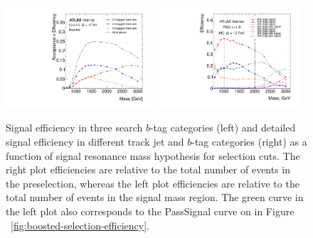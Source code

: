 \begin{figure}
\begin{center}
\includegraphics[width=0.48\textwidth,angle=-90]{figures/boosted/SigEff/region_lst_Moriond_bkg_9_Efficiency_PreSel.pdf}
\includegraphics[width=0.48\textwidth,angle=-90]{figures/boosted/SigEff/detail_lst_Moriond_Efficiency_AllTag_Signal.pdf}
  \caption{Signal efficiency in three search $b$-tag categories (left) and detailed signal efficiency in different track jet and $b$-tag categories (right) as a function of signal resonance mass hypothesis for selection cuts. The right plot efficiencies are relative to the total number of events in the preselection, whereas the left plot efficiencies are relative to the total number of events in the signal mass region. The green curve in the left plot also corresponds to the PassSignal curve on in Figure ~\ref{fig:boosted-selection-efficiency}.}
  \label{fig:boosted-selection-signal-efficiency}
\end{center}
\end{figure}

